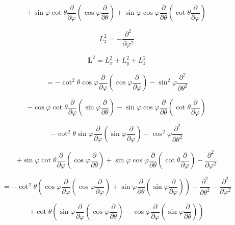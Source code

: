 \documentclass[12pt]{article}
\begin{document}
\[
    + \sin{\varphi} \cot{\theta}\frac{\partial}{\partial \varphi}
    \left(\cos{\varphi} \frac{\partial}{\partial \theta}\right)
    + \sin{\varphi} \cos{\varphi} \frac{\partial}{\partial \theta}
    \left(\cot{\theta} \frac{\partial}{\partial \varphi}\right)
\]

\[
    L_z^2 = - \frac{\partial^2}{\partial \varphi^2}
\]

\[
    \textbf{L}^2 = L_x^2 + L_y^2 + L_z^2
\]

\[
    = - \cot^2{\theta} \cos{\varphi} \frac{\partial}{\partial \varphi}
    \left(\cos{\varphi} \frac{\partial}{\partial \varphi}\right)
    - \sin^2{\varphi} \frac{\partial^2}{\partial \theta^2}
\]

\[
    - \cos{\varphi} \cot{\theta}\frac{\partial}{\partial \varphi}
    \left(\sin{\varphi} \frac{\partial}{\partial \theta}\right)
    - \sin{\varphi} \cos{\varphi} \frac{\partial}{\partial \theta}
    \left(\cot{\theta}\frac{\partial}{\partial \varphi}\right)
\]

\[
    - \cot^2{\theta} \sin{\varphi} \frac{\partial}{\partial \varphi}
    \left(\sin{\varphi} \frac{\partial}{\partial \varphi}\right)
    - \cos^2{\varphi} \frac{\partial^2}{\partial \theta^2}
\]

\[
    + \sin{\varphi} \cot{\theta}\frac{\partial}{\partial \varphi}
    \left(\cos{\varphi} \frac{\partial}{\partial \theta}\right)
    + \sin{\varphi} \cos{\varphi} \frac{\partial}{\partial \theta}
    \left(\cot{\theta} \frac{\partial}{\partial \varphi}\right)
    - \frac{\partial^2}{\partial \varphi^2}
\]

\[
    = - \cot^2{\theta}
    \left(
    \cos{\varphi} \frac{\partial}{\partial \varphi}
    \left(
        \cos{\varphi} \frac{\partial}{\partial \varphi}
        \right)
    + \sin{\varphi} \frac{\partial}{\partial \theta}
    \left(
        \sin{\varphi} \frac{\partial}{\partial \varphi}
        \right)
    \right)
    - \frac{\partial^2}{\partial \theta^2}
    - \frac{\partial^2}{\partial \varphi^2}
\]

\[
    + \cot{\theta}
    \left(
    \sin{\varphi} \frac{\partial}{\partial \varphi}
    \left(\cos{\varphi} \frac{\partial}{\partial \theta}\right)
    - \cos{\varphi} \frac{\partial}{\partial \varphi}
    \left(\sin{\varphi} \frac{\partial}{\partial \theta}\right)
    \right)
\] %



\nocite{arfken2013mathematical}
\nocite{El-Deeb_PEU-356_Assignments}
\end{document}
